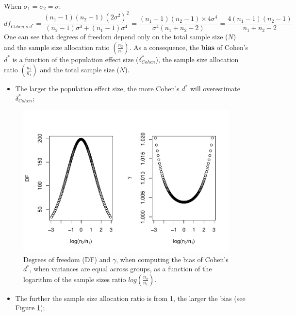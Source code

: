 \documentclass[
  english,
  man,mask]{apa6}
\providecommand{\tightlist}{%
  \setlength{\itemsep}{0pt}\setlength{\parskip}{0pt}}
\begin{document}
When \(\sigma_1=\sigma_2=\sigma\):
\[df_{Cohen's \; d^*} = \frac{(n_1-1)(n_2-1)(2\sigma^2)^2}{(n_2-1)\sigma^4+(n_1-1)\sigma^4} = \frac{(n_1-1)(n_2-1)\times 4\sigma^4}{\sigma^4(n_1+n_2-2)} = \frac{4(n_1-1)(n_2-1)}{n_1+n_2-2}\]
One can see that degrees of freedom depend only on the total sample size (\(N\)) and the sample size allocation ratio \(\left( \frac{n_2}{n_1}\right)\). As a consequence, the \textbf{bias} of Cohen's \(d^*\) is a function of the population effect size (\(\delta^*_{Cohen}\)), the sample size allocation ratio \(\left( \frac{n_2}{n_1}\right)\) and the total sample size (\(N\)).

\begin{itemize}
\tightlist
\item
  The larger the population effect size, the more Cohen's \(d^*\) will overestimate \(\delta^*_{Cohen}\);
\end{itemize}

\begin{figure}
\centering
\includegraphics{SupMat1_files/figure-latex/biascohendprimehomNratio2-1.pdf}
\caption{\label{fig:biascohendprimehomNratio2}Degrees of freedom (DF) and \(\gamma\), when computing the bias of Cohen's \(d^*\), when variances are equal across groups, as a function of the logarithm of the sample sizes ratio \(log\left(\frac{n_2}{n_1} \right)\).}
\end{figure}

\begin{itemize}
\tightlist
\item
  The further the sample size allocation ratio is from 1, the larger the bias (see Figure \ref{fig:biascohendprimehomNratio2});
\end{itemize}
\end{document}
